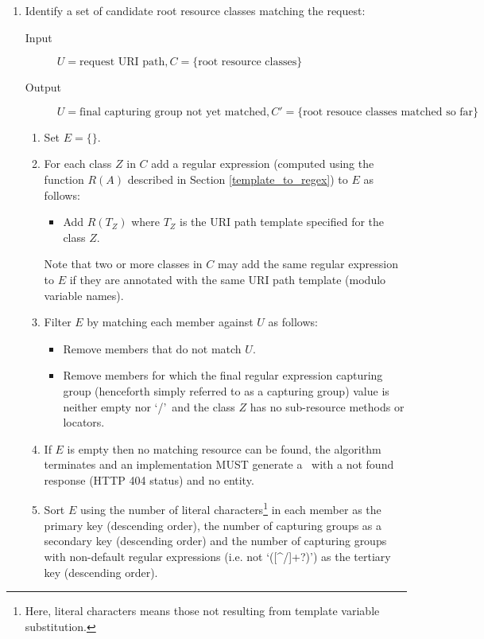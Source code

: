 \begin{enumerate}
\item Identify a set of candidate root resource classes matching the request:

\begin{description}
\item[Input]  $U=\mbox{request URI path},C=\{\mbox{root resource classes}\}$
\item[Output] $U=\mbox{final capturing group not yet matched}, C'=\{\mbox{root resouce classes matched so far}\}$
\end{description}

\begin{enumerate}
\item Set $E=\{\}$.

\item For each class $Z$ in $C$ add a regular expression (computed using the function $R(A)$ described in Section \ref{template_to_regex}) to $E$ as follows:
\begin{itemize}
\item\label{build_E} Add $R(T_Z)$ where $T_Z$ is the URI path template specified for the class $Z$.
\end{itemize}
Note that two or more classes in $C$ may add the same regular expression to $E$ if they are
annotated with the same URI path template (modulo variable names).

\item Filter $E$ by matching each member against $U$ as follows:
\begin{itemize}
\item Remove members that do not match $U$.
\item Remove members for which the final regular expression capturing group (henceforth simply referred to as a capturing group) value is neither empty nor \lq/\rq\ and the class $Z$ has no sub-resource methods or locators.
\end{itemize}

\item If $E$ is empty then no matching resource can be found, the algorithm terminates and an implementation MUST generate a \WebAppExc\ with a not found response (HTTP 404 status) and no entity. 

\item Sort $E$ using the number of literal characters\footnote{Here, literal characters means those not resulting from template variable substitution.} in each member as the primary key (descending order), the number of capturing groups as a secondary key (descending order) and the number of capturing groups with non-default regular expressions (i.e. not \lq([\^{ }/]+?)\rq) as the tertiary key (descending order).


\end{enumerate}
\end{enumerate}
